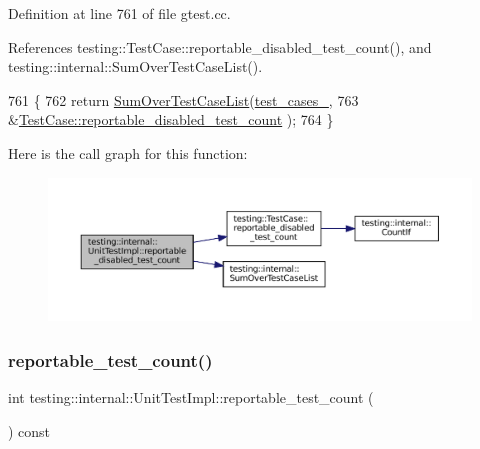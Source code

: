Definition at line 761 of file gtest.\+cc.



References testing\+::\+Test\+Case\+::reportable\+\_\+disabled\+\_\+test\+\_\+count(), and testing\+::internal\+::\+Sum\+Over\+Test\+Case\+List().


\begin{DoxyCode}
761                                                        \{
762   \textcolor{keywordflow}{return} \hyperlink{namespacetesting_1_1internal_a564f9e608c608736ebe2199ab831745b}{SumOverTestCaseList}(\hyperlink{classtesting_1_1internal_1_1UnitTestImpl_a79ec0f733ada2898efd1a7fbd8587fb3}{test\_cases\_},
763                              &\hyperlink{classtesting_1_1TestCase_ad6b34335955967bc361b2fbacd2dd6c9}{TestCase::reportable\_disabled\_test\_count}
      );
764 \}
\end{DoxyCode}
Here is the call graph for this function\+:
\nopagebreak
\begin{figure}[H]
\begin{center}
\leavevmode
\includegraphics[width=350pt]{classtesting_1_1internal_1_1UnitTestImpl_a04827d118a329af68a1de2d6b93eb4e5_cgraph}
\end{center}
\end{figure}
\mbox{\label{classtesting_1_1internal_1_1UnitTestImpl_addb3896c4e0973bb5d2744fcb158afce}} 
\subsubsection{\texorpdfstring{reportable\+\_\+test\+\_\+count()}{reportable\_test\_count()}}
{\footnotesize\ttfamily int testing\+::internal\+::\+Unit\+Test\+Impl\+::reportable\+\_\+test\+\_\+count (\begin{DoxyParamCaption}{ }\end{DoxyParamCaption}) const}



